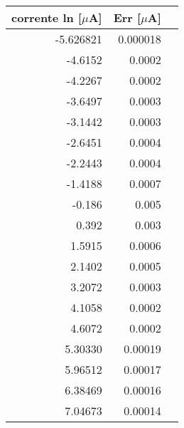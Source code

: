 \begin{tabular}{rrr}
\toprule
corrente ln [$\mu$A] & Err [$\mu$A] \\
\midrule
-5.626821 & 0.000018 \\
-4.6152 & 0.0002 \\
-4.2267 & 0.0002 \\
-3.6497 & 0.0003 \\
-3.1442 & 0.0003 \\
-2.6451 & 0.0004 \\
-2.2443 & 0.0004 \\
-1.4188 & 0.0007 \\
-0.186 & 0.005 \\
0.392 & 0.003 \\
1.5915 & 0.0006 \\
2.1402 & 0.0005 \\
3.2072 & 0.0003 \\
4.1058 & 0.0002 \\
4.6072 & 0.0002 \\
5.30330 & 0.00019 \\
5.96512 & 0.00017 \\
6.38469 & 0.00016 \\
7.04673 & 0.00014 \\
\bottomrule
\end{tabular}
